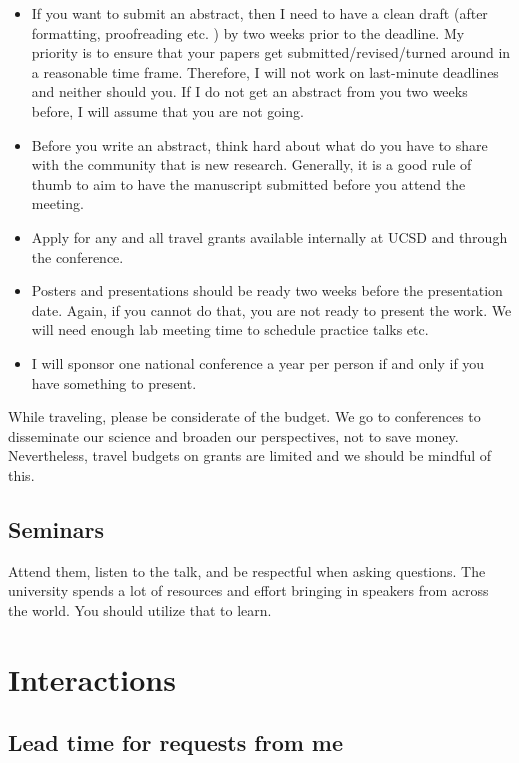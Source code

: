 \documentclass[12pt]{article}
\begin{document}
\begin{itemize}
  \item If you want to submit an abstract, then I need to have a clean draft (after formatting, proofreading etc. ) by two weeks prior to the deadline.
        My priority is to ensure that your papers get submitted/revised/turned around in a reasonable time frame.
        Therefore, I will not work on last-minute deadlines and neither should you.
        If I do not get an abstract from you two weeks before, I will assume that you are not going.
  \item Before you write an abstract, think hard about what do you have to share with the community that is new research.
        Generally, it is a good rule of thumb to aim to have the manuscript submitted before you attend the meeting.
  \item Apply for any and all travel grants available internally at UCSD and through the conference.
  \item Posters and presentations should be ready two weeks before the presentation date.
        Again, if you cannot do that, you are not ready to present the work.
        We will need enough lab meeting time to schedule practice talks etc.
  \item I will sponsor one national conference a year per person if and only if you have something to present.
\end{itemize}

While traveling, please be considerate of the budget.
We go to conferences to disseminate our science and broaden our perspectives, not to save money.
Nevertheless, travel budgets on grants are limited and we should be mindful of this.

\subsection{Seminars}

Attend them, listen to the talk, and be respectful when asking questions.
The university spends a lot of resources and effort bringing in speakers from across the world.
You should utilize that to learn.

\section{Interactions}

\subsection{Lead time for requests from me}
\end{document}
